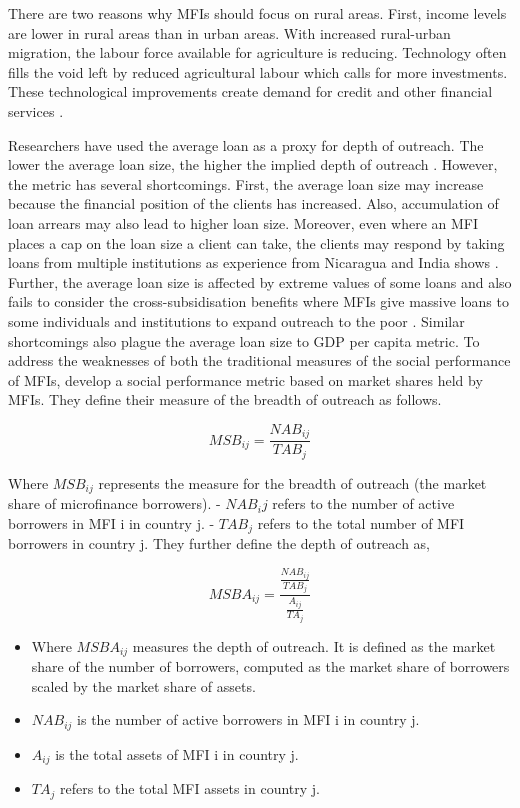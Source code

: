 \documentclass[a4paper, nobind]{templates/ociamthesis}
\begin{document}
There are two reasons why MFIs should focus on rural areas. First, income levels are lower in rural areas than in urban areas. With increased rural-urban migration, the labour force available for agriculture is reducing. Technology often fills the void left by reduced agricultural labour which calls for more investments. These technological improvements create demand for credit and other financial services \autocite{mersland2014microfinance}.

Researchers have used the average loan as a proxy for depth of outreach. The lower the average loan size, the higher the implied depth of outreach \autocite{d2017ngos}. However, the metric has several shortcomings. First, the average loan size may increase because the financial position of the clients has increased. Also, accumulation of loan arrears may also lead to higher loan size. Moreover, even where an MFI places a cap on the loan size a client can take, the clients may respond by taking loans from multiple institutions as experience from Nicaragua and India shows \autocite{bastiaensen2013after}. Further, the average loan size is affected by extreme values of some loans and also fails to consider the cross-subsidisation benefits where MFIs give massive loans to some individuals and institutions to expand outreach to the poor \autocite{chattopadhyay2017applicability,bibi2018new}. Similar shortcomings also plague the average loan size to GDP per capita metric. To address the weaknesses of both the traditional measures of the social performance of MFIs,\textcite{bibi2018new} develop a social performance metric based on market shares held by MFIs. They define their measure of the breadth of outreach as follows.

\begin{equation}
MSB_{ij} = \frac{NAB_{ij}}{TAB_j}
\end{equation}

Where \(MSB_{ij}\) represents the measure for the breadth of outreach (the market share of microfinance borrowers).
- \(NAB_ij\) refers to the number of active borrowers in MFI i in country j.
- \(TAB_j\) refers to the total number of MFI borrowers in country j.
They further define the depth of outreach as,

\begin{equation}
MSBA_{ij} = \frac{\frac{NAB_{ij}}{TAB_{j}}}{\frac{A_{ij}}{TA_j}}
\end{equation}

\begin{itemize}
\item
  Where \(MSBA_{ij}\) measures the depth of outreach. It is defined as the market share of the number of borrowers, computed as the market share of borrowers scaled by the market share of assets.
\item
  \(NAB_{ij}\) is the number of active borrowers in MFI i in country j.
\item
  \(A_{ij}\) is the total assets of MFI i in country j.
\item
  \(TA_j\) refers to the total MFI assets in country j.
\end{itemize}
\end{document}
